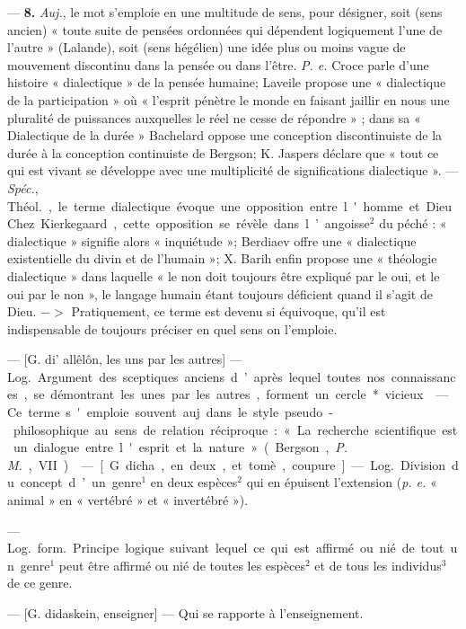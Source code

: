 \begin{itemize}[leftmargin=1cm, label=, itemsep=1pt]
— {\bf 8.} {\it Auj.}, le mot s'emploie en
une multitude de sens, pour désigner, soit (sens ancien) « toute suite
de pensées ordonnées qui dépendent
logiquement l’une de l’autre » (Lalande), soit (sens hégélien) une idée
plus ou moins vague de mouvement
discontinu dans la pensée ou dans
l’être. {\it P. e.} Croce parle d’une histoire
« dialectique » de la pensée humaine;
Laveile propose une « dialectique de
la participation » où « l'esprit pénètre
le monde en faisant jaillir en nous
une pluralité de puissances auxquelles le réel ne cesse de répondre » ;
dans sa « Dialectique de la durée »
Bachelard oppose une conception
discontinuiste de la durée à la conception continuiste de Bergson;
K. Jaspers déclare que « tout ce qui
est vivant se développe avec une
multiplicité de significations dialectique ». — {\it Spéc.}, \si{Théol.}, le terme
dialectique évoque une opposition
entre l'homme et Dieu. Chez Kierkegaard, cette opposition se révèle
dans l’angoisse$^2$ du péché : « dialectique » signifie alors « inquiétude »;
Berdiaev offre une « dialectique
existentielle du divin et de l’humain »; X. Barih enfin propose une
« théologie dialectique » dans laquelle « le non doit toujours être
expliqué par le oui, et le oui par le
non », le langage humain étant toujours déficient quand il s’agit de
Dieu. $->$ Pratiquement, ce terme
est devenu si équivoque, qu'il est
indispensable de toujours préciser
en quel sens on l’emploie.

 — [G. di’ allêlôn, les uns par les
autres] — \si{Log.} Argument des
sceptiques anciens d’après lequel
toutes nos connaissances, se démontrant les unes par les autres, forment un cercle* vicieux.

 — Ce terme s'emploie souvent auj. dans le style pseudo-philosophique au sens de relation réciproque : « La recherche scientifique
est un dialogue entre l'esprit et la
nature » (Bergson, {\it P. M.}, VII).

 — [G. dicha, en deux, et
tomè, coupure] — \si{Log.} Division
du concept d’un genre$^1$ en deux espèces$^2$ qui en épuisent l’extension
({\it p. e.} « animal » en « vertébré » et
« invertébré »).

 — \si{Log.}
\si{form.} Principe logique suivant lequel ce qui est affirmé ou nié de
tout un genre$^1$ peut être affirmé ou
nié de toutes les espèces$^2$ et de tous
les individus$^3$ de ce genre.

 — [G. didaskein, enseigner]
— Qui se rapporte à l’enseignement.


\end{itemize}

